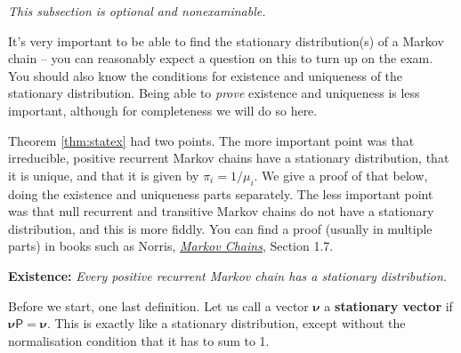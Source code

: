 \documentclass[
  a4paper,
]{article}
\theoremstyle{definition}
\theoremstyle{definition}
\theoremstyle{definition}
\theoremstyle{remark}
\begin{document}
\emph{This subsection is optional and nonexaminable.}

It's very important to be able to find the stationary distribution(s) of a Markov chain -- you can reasonably expect a question on this to turn up on the exam. You should also know the conditions for existence and uniqueness of the stationary distribution. Being able to \emph{prove} existence and uniqueness is less important, although for completeness we will do so here.

Theorem \ref{thm:statex} had two points. The more important point was that irreducible, positive recurrent Markov chains have a stationary distribution, that it is unique, and that it is given by \(\pi_i = 1/\mu_i\). We give a proof of that below, doing the existence and uniqueness parts separately.
The less important point was that null recurrent and transitive Markov chains do not have a stationary distribution, and this is more fiddly. You can find a proof (usually in multiple parts) in books such as Norris, \href{https://www.statslab.cam.ac.uk/~james/Markov/}{\emph{Markov Chains}}, Section 1.7.

\textbf{Existence:} \emph{Every positive recurrent Markov chain has a stationary distribution.}

Before we start, one last definition. Let us call a vector \(\boldsymbol\nu\) a \textbf{stationary vector} if \(\boldsymbol\nu \mathsf P = \boldsymbol\nu\). This is exactly like a stationary distribution, except without the normalisation condition that it has to sum to 1.
\end{document}
